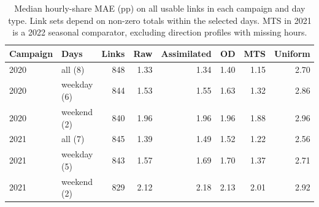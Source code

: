 \begin{table}[htbp]\centering
\caption{Median hourly-share MAE (pp) on all usable links in each campaign and day type. Link sets depend on non-zero totals within the selected days. MTS in 2021 is a 2022 seasonal comparator, excluding direction profiles with missing hours.}
\label{tab:baselines}
\begin{tabular}{@{}llrrrrrr@{}}\toprule
Campaign & Days & Links & Raw & Assimilated & OD & MTS & Uniform \\\midrule
2020 & all (8) & 848 & 1.33 & 1.34 & 1.40 & 1.15 & 2.70 \\
2020 & weekday (6) & 844 & 1.53 & 1.55 & 1.63 & 1.32 & 2.86 \\
2020 & weekend (2) & 840 & 1.96 & 1.96 & 1.96 & 1.88 & 2.96 \\
\midrule
2021 & all (7) & 845 & 1.39 & 1.49 & 1.52 & 1.22 & 2.56 \\
2021 & weekday (5) & 843 & 1.57 & 1.69 & 1.70 & 1.37 & 2.71 \\
2021 & weekend (2) & 829 & 2.12 & 2.18 & 2.13 & 2.01 & 2.92 \\
\bottomrule\end{tabular}\end{table}
